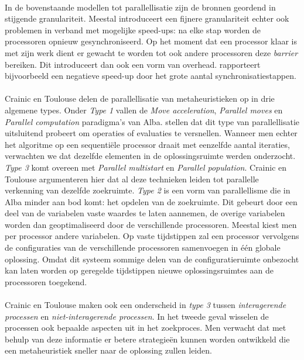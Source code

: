 \paragraph{}
In de bovenstaande modellen tot parallellisatie zijn de bronnen geordend in stijgende granulariteit. Meestal introduceert een fijnere granulariteit echter ook problemen in verband met mogelijke speed-ups: na elke stap worden de processoren opnieuw gesynchroniseerd. Op het moment dat een processor klaar is met zijn werk dient er gewacht te worden tot ook andere processoren deze \emph{barrier} bereiken. Dit introduceert dan ook een vorm van overhead. \cite{conf/glvlsi/HaldarNCB00} rapporteert bijvoorbeeld een negatieve speed-up door het grote aantal synchronisatiestappen.

\paragraph{}
Crainic en Toulouse\cite{crainicAndToulouse} delen de parallellisatie van metaheuristieken op in drie algemene types. Onder \emph{Type 1} vallen de \emph{Move acceleration}, \emph{Parallel moves} en \emph{Parallel computation} paradigma's van Alba. \cite{crainicAndToulouse} stellen dat dit type van parallellisatie uitsluitend probeert om operaties of evaluaties te versnellen. Wanneer men echter het algoritme op een sequenti\"ele processor draait met eenzelfde aantal iteraties, verwachten we dat dezelfde elementen in de oplossingsruimte werden onderzocht. \emph{Type 3} komt overeen met \emph{Parallel multistart} en \emph{Parallel population}. Crainic en Toulouse argumenteren hier dat al deze technieken leiden tot parallelle verkenning van dezelfde zoekruimte. \emph{Type 2} is een vorm van parallellisme die in Alba minder aan bod komt: het opdelen van de zoekruimte. Dit gebeurt door een deel van de variabelen vaste waardes te laten aannemen, de overige variabelen worden dan geoptimaliseerd door de verschillende processoren. Meestal kiest men per processor andere variabelen. Op vaste tijdstippen zal een processor vervolgens de configuraties van de verschillende processoren samenvoegen in \'e\'en globale oplossing. Omdat dit systeem sommige delen van de configuratieruimte onbezocht kan laten worden op geregelde tijdstippen nieuwe oplossingsruimtes aan de processoren toegekend.

\paragraph{}
Crainic en Toulouse maken ook een onderscheid in \emph{type 3} tussen \emph{interagerende processen} en \emph{niet-interagerende processen}. In het tweede geval wisselen de processen ook bepaalde aspecten uit in het zoekproces. Men verwacht dat met behulp van deze informatie er betere strategie\"en kunnen worden ontwikkeld die een metaheuristiek sneller naar de oplossing zullen leiden.


